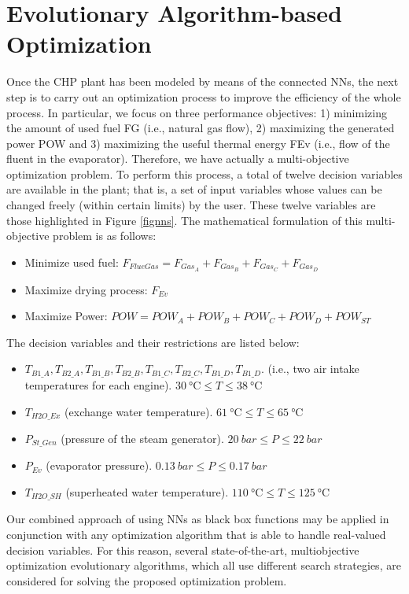 \section{Evolutionary Algorithm-based Optimization}
\label{sec:optimization}
Once the CHP plant has been modeled by means of the connected NNs, the next step is to  carry out an optimization process to improve the efficiency of the whole process. In particular, we focus on three performance objectives: 1) minimizing the amount of used fuel FG (i.e., natural gas flow), 2) maximizing the generated power POW and 3) maximizing the useful thermal energy FEv (i.e., flow of the fluent in the evaporator). Therefore, we have actually a multi-objective optimization problem. To perform this process, a total of twelve decision variables  are available in the plant; that is, a set of input variables whose values can be changed freely (within certain limits) by the user. These twelve variables are those highlighted in Figure  \ref{fignns}. The mathematical formulation of this multi-objective problem is as follows:
%
\begin{itemize}[-]
	\item Minimize used fuel:		$F_{FlueGas} = F_{Gas_A} + F_{Gas_B} + F_{Gas_C} + F_{Gas_D}$
	\item Maximize drying process: 	$F_{Ev}$
	\item Maximize Power:		$POW = POW_A + POW_B + POW_C + POW_D + POW_{ST}$
\end{itemize}
%
The decision variables and their restrictions are listed below:
%
\begin{itemize}[-]
	\item $T_{B1\_A}, T_{B2\_A}, T_{B1\_B}, T_{B2\_B}, T_{B1\_C}, T_{B2\_C}, T_{B1\_D}, T_{B1\_D}$. (i.e., two air intake temperatures for each engine). $\SI{30}{\celsius} \leq T  \leq  \SI{38}{\celsius}$
	\item $T_{H2O\_Ex}$ (exchange water temperature). $\SI{61}{\celsius}  \leq T  \leq  \SI{65}{\celsius}$
	\item $P_{St\_Gen}$ (pressure of the steam generator). $\SI{20}{bar}  \leq  P  \leq  \SI{22}{bar}$
	\item $P_{Ev}$ (evaporator pressure). $\SI{0.13}{bar}  \leq  P  \leq  \SI{0.17}{bar}$
	\item $T_{H2O\_SH}$ (superheated water temperature). $\SI{110}{\celsius}  \leq  T  \leq  \SI{125}{\celsius}$
\end{itemize}

Our combined approach of using NNs as black box functions may be applied in conjunction with any optimization algorithm that is able to handle real-valued decision variables. For this reason, several state-of-the-art, multiobjective optimization evolutionary algorithms, which all use different search strategies, are considered for solving the proposed optimization problem.

